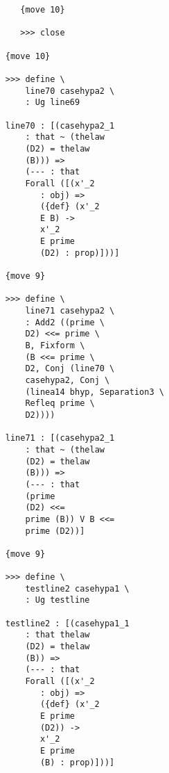 \documentclass[12pt]{article}
\begin{document}
\begin{verbatim}
                                 {move 10}

                                 >>> close

                              {move 10}

                              >>> define \
                                  line70 casehypa2 \
                                  : Ug line69

                              line70 : [(casehypa2_1 
                                  : that ~ (thelaw 
                                  (D2) = thelaw 
                                  (B))) => 
                                  (--- : that 
                                  Forall ([(x'_2 
                                     : obj) => 
                                     ({def} (x'_2 
                                     E B) -> 
                                     x'_2 
                                     E prime 
                                     (D2) : prop)]))]

                              {move 9}

                              >>> define \
                                  line71 casehypa2 \
                                  : Add2 ((prime \
                                  D2) <<= prime \
                                  B, Fixform \
                                  (B <<= prime \
                                  D2, Conj (line70 \
                                  casehypa2, Conj \
                                  (linea14 bhyp, Separation3 \
                                  Refleq prime \
                                  D2))))

                              line71 : [(casehypa2_1 
                                  : that ~ (thelaw 
                                  (D2) = thelaw 
                                  (B))) => 
                                  (--- : that 
                                  (prime 
                                  (D2) <<= 
                                  prime (B)) V B <<= 
                                  prime (D2))]

                              {move 9}

                              >>> define \
                                  testline2 casehypa1 \
                                  : Ug testline

                              testline2 : [(casehypa1_1 
                                  : that thelaw 
                                  (D2) = thelaw 
                                  (B)) => 
                                  (--- : that 
                                  Forall ([(x'_2 
                                     : obj) => 
                                     ({def} (x'_2 
                                     E prime 
                                     (D2)) -> 
                                     x'_2 
                                     E prime 
                                     (B) : prop)]))]


\end{verbatim}
\end{document}
